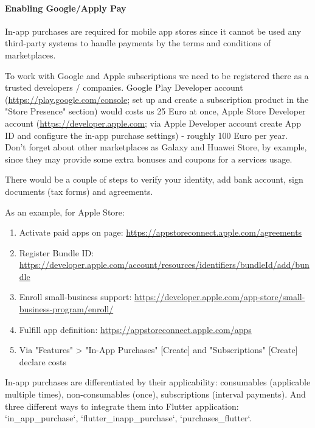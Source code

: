 \paragraph{Enabling Google/Apply Pay}

In-app purchases are required for mobile app stores since it cannot be used any third-party systems to handle payments
by the terms and conditions of marketplaces.

To work with Google and Apple subscriptions we need to be registered there as a trusted developers / companies. Google 
Play Developer account (\href{https://play.google.com/console}{https://play.google.com/console}; set up and create a 
subscription product in the "Store Presence" section) would costs us 25 Euro at once, Apple Store Developer 
account (\href{https://developer.apple.com}{https://developer.apple.com}; via Apple Developer account create App ID and 
configure the in-app purchase settings) - roughly 100 Euro per year. Don't forget about other marketplaces as 
Galaxy and Huawei Store, by example, since they may provide some extra bonuses and coupons for a services usage.

There would be a couple of steps to verify your identity, add bank account, sign documents (tax forms) and agreements.

As an example, for Apple Store:
\begin{enumerate}
  \item Activate paid apps on page: \href{https://appstoreconnect.apple.com/agreements}{https://appstoreconnect.apple.com/agreements}
  \item Register Bundle ID: \href{https://developer.apple.com/account/resources/identifiers/bundleId/add/bundle}{https://developer.apple.com/account/resources/identifiers/bundleId/add/bundle}
  \item Enroll small-business support: \href{https://developer.apple.com/app-store/small-business-program/enroll/}{https://developer.apple.com/app-store/small-business-program/enroll/}
  \item Fulfill app definition: \href{https://appstoreconnect.apple.com/apps}{https://appstoreconnect.apple.com/apps}
  \item Via "Features" > "In-App Purchases" [Create] and "Subscriptions" [Create] declare costs
\end{enumerate}

In-app purchases are differentiated by their applicability: consumables (applicable multiple times), non-consumables 
(once), subscriptions (interval payments). And three different ways to integrate them into Flutter application:
`in\_app\_purchase`, `flutter\_inapp\_purchase`, `purchases\_flutter`.
